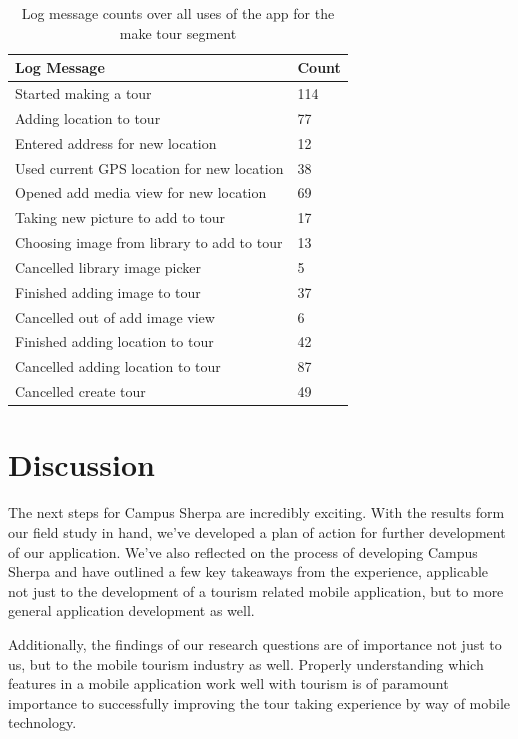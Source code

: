 \documentclass{sigchi}
\begin{document}
\begin{table}
\begin{tabular}{|l|l|}\hline
\textbf{Log Message} & \textbf{Count} \\ \hline
 Started making a tour & 114 \\ \hline
 Adding location to tour & 77 \\ \hline
 Entered address for new location & 12 \\ \hline
 Used current GPS location for new location & 38 \\ \hline
 Opened add media view for new location & 69 \\ \hline
 Taking new picture to add to tour & 17 \\ \hline
 Choosing image from library to add to tour & 13 \\ \hline
 Cancelled library image picker & 5 \\ \hline
 Finished adding image to tour & 37 \\ \hline
 Cancelled out of add image view & 6 \\ \hline
 Finished adding location to tour & 42 \\ \hline
 Cancelled adding location to tour & 87 \\ \hline
 Cancelled create tour & 49 \\ \hline
\end{tabular}
\caption{Log message counts over all uses of the app for the make tour segment}
\label{logging-results-make}
\end{table}

\section{Discussion}

The next steps for Campus Sherpa are incredibly exciting. With the results form our field study in hand, we've developed a plan of action for further development of our application. We've also reflected on the process of developing Campus Sherpa and have outlined a few key takeaways from the experience, applicable not just to the development of a tourism related mobile application, but to more general application development as well.

Additionally, the findings of our research questions are of importance not just to us, but to the mobile tourism industry as well. Properly understanding which features in a mobile application work well with tourism is of paramount importance to successfully improving the tour taking experience by way of mobile technology.
\end{document}
